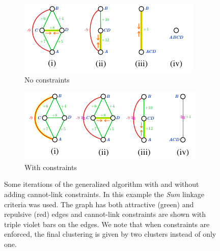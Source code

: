\begin{figure}
\centering
        \begin{subfigure}[t]{0.46 \textwidth}
        \centering
        \includegraphics[width=\textwidth]{./figs/example_no_constr.pdf}
        \caption{No constraints}
    \end{subfigure} \hfill
    \begin{subfigure}[t]{0.46 \textwidth}
        \centering
        \includegraphics[width=\textwidth]{./figs/example_with_constr.pdf}
        \caption{With constraints}
    \end{subfigure}
\caption{Some iterations of the generalized algorithm with and without adding cannot-link constraints. In this example the \emph{Sum} linkage criteria was used. The graph has both attractive (green) and repulsive (red) edges and cannot-link constraints are shown with triple violet bars on the edges. We note that when constraints are enforced, the final clustering is given by two clusters instead of only one.}
\label{fig:algorithm_with_without_CLC}
\end{figure}
